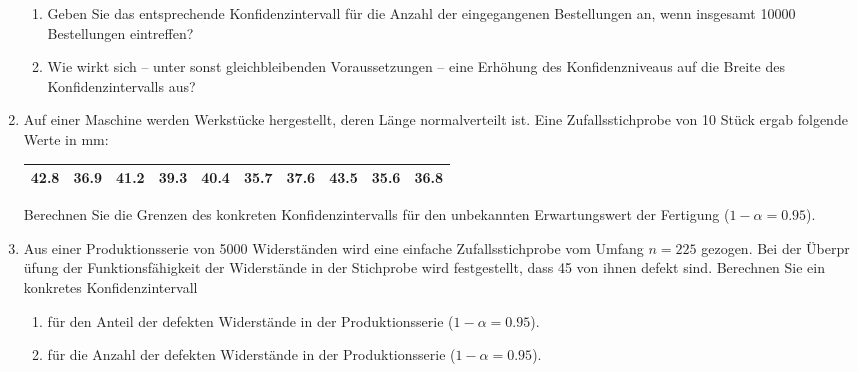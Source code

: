 \begin{enumerate}
\begin{enumerate}
\item Geben Sie das entsprechende Konfidenzintervall f\"{u}r die Anzahl der
eingegangenen Bestellungen an, wenn insgesamt 10000 Bestellungen eintreffen?

\item Wie wirkt sich -- unter sonst gleichbleibenden Voraussetzungen -- eine
Erh\"{o}hung des Konfidenzniveaus auf die Breite des Konfidenzintervalls aus?
\end{enumerate}

\item Auf einer Maschine werden Werkst\"{u}cke hergestellt, deren L\"{a}nge
normalverteilt ist. Eine Zufallsstichprobe von 10 St\"{u}ck ergab folgende
Werte in mm:

\begin{center}%
\begin{tabular}{|c|c|c|c|c|c|c|c|c|c|}
\hline
42.8 & 36.9 & 41.2 & 39.3 & 40.4 & 35.7 & 37.6 & 43.5 & 35.6 & 36.8 \\ \hline
\end{tabular}
\end{center}%

Berechnen Sie die Grenzen des konkreten Konfidenzintervalls f\"{u}r den
unbekannten Erwartungswert der Fertigung ($1-\alpha =0.95$).

\item Aus einer Produktionsserie von 5000 Widerst\"{a}nden wird eine
einfache Zufallsstichprobe vom Umfang $n=225$ gezogen. Bei der \"{U}berpr%
\"{u}fung der Funktionsf\"{a}higkeit der Widerst\"{a}nde in der Stichprobe
wird festgestellt, dass 45 von ihnen defekt sind. Berechnen Sie ein
konkretes Konfidenzintervall

\begin{enumerate}
\item f\"{u}r den Anteil der defekten Widerst\"{a}nde in der
Produktionsserie ($1-\alpha =0.95$).

\item f\"{u}r die Anzahl der defekten Widerst\"{a}nde in der
Produktionsserie ($1-\alpha =0.95$).
\end{enumerate}


\end{enumerate}
